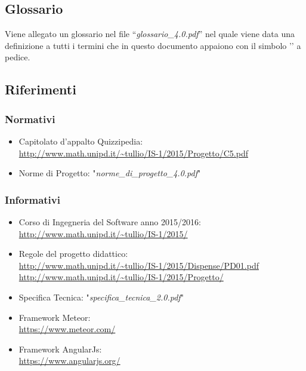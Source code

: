 \documentclass[a4paper,11pt]{article}
\begin{document}
	\subsection{Glossario}
	Viene allegato un glossario nel file ``\textit{glossario\_4.0.pdf}'' nel quale viene data una definizione a tutti i termini che in questo documento appaiono con il simbolo '\addglos' a pedice.
	\subsection{Riferimenti}
		\subsubsection{Normativi}

		\begin{itemize}
			\item Capitolato d'appalto Quizzipedia:\\
			\url{http://www.math.unipd.it/~tullio/IS-1/2015/Progetto/C5.pdf}
			\item Norme di Progetto: "\textit{norme\_di\_progetto\_4.0.pdf}"
		\end{itemize}
		\subsubsection{Informativi}
		\begin{itemize}
			\item Corso di Ingegneria del Software anno 2015/2016:\\
			\url{http://www.math.unipd.it/~tullio/IS-1/2015/}
			\item Regole del progetto didattico:\\
			\url{http://www.math.unipd.it/~tullio/IS-1/2015/Dispense/PD01.pdf}\\
			\url{http://www.math.unipd.it/~tullio/IS-1/2015/Progetto/}
			\item Specifica Tecnica: "\textit{specifica\_tecnica\_2.0.pdf}"
			\item Framework Meteor:\\
			\url{https://www.meteor.com/}
			\item Framework AngularJs:\\
			\url{https://www.angularjs.org/}
		\end{itemize}
	\pagebreak
	\newpage
	
	\newpage
	
	\newpage
	
	\newpage
	
\end{document}
